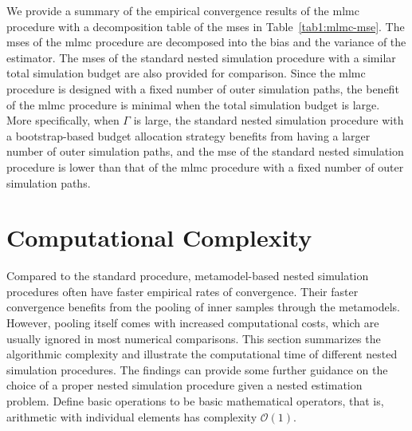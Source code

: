 We provide a summary of the empirical convergence results of the \gls{mlmc} procedure with a decomposition table of the \gls{mse}s in Table~\ref{tab1:mlmc-mse}.
The \gls{mse}s of the \gls{mlmc} procedure are decomposed into the bias and the variance of the estimator.
The \gls{mse}s of the standard nested simulation procedure with a similar total simulation budget are also provided for comparison.
Since the \gls{mlmc} procedure is designed with a fixed number of outer simulation paths, the benefit of the \gls{mlmc} procedure is minimal when the total simulation budget is large.
More specifically, when $\Gamma$ is large, the standard nested simulation procedure with a bootstrap-based budget allocation strategy benefits from having a larger number of outer simulation paths, and the \gls{mse} of the standard nested simulation procedure is lower than that of the \gls{mlmc} procedure with a fixed number of outer simulation paths.

\section{Computational Complexity}\label{sec1:computational-complexity}
Compared to the standard procedure, metamodel-based nested simulation procedures often have faster empirical rates of convergence.
Their faster convergence benefits from the pooling of inner samples through the metamodels. 
However, pooling itself comes with increased computational costs, which are usually ignored in most numerical comparisons. 
This section summarizes the algorithmic complexity and illustrate the computational time of different nested simulation procedures.
The findings can provide some further guidance on the choice of a proper nested simulation procedure given a nested estimation problem.
Define basic operations to be basic mathematical operators, that is, arithmetic with individual elements has complexity $\mathcal{O}(1)$.

